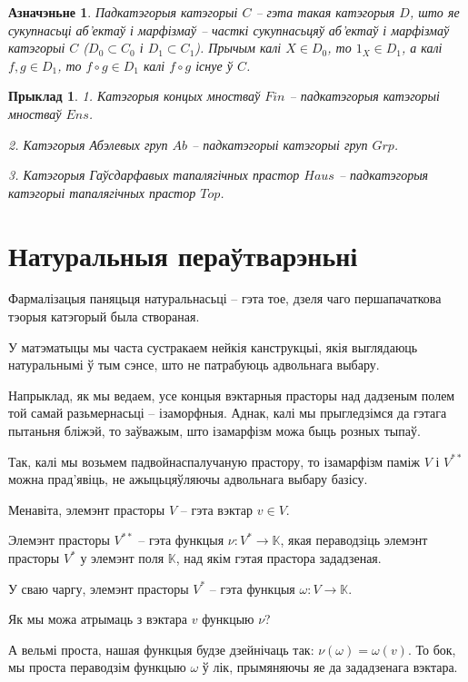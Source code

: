 \documentclass[a4paper,12pt]{book}
\newtheorem{example}{Прыклад}[section]
\newtheorem{definition}{Азначэньне}[section]
\begin{document}
\begin{definition}
  Падкатэгорыя катэгорыі $C$ -- гэта такая катэгорыя $D$, што яе
  сукупнасьці аб'ектаў і марфізмаў -- часткі сукупнасьцяў аб'ектаў
  і марфізмаў катэгорыі $C$ ($D_0 \subset C_0$ і $D_1 \subset
  C_1$). Прычым калі $X \in D_0$, то $1_X \in D_1$, а калі $f, g \in
  D_1$, то $f \circ g \in D_1$ калі $f \circ g$ існуе ў $C$.
\end{definition}

\begin{example}
  1. Катэгорыя концых мностваў $Fin$ -- падкатэгорыя катэгорыі
  мностваў $Ens$.

  2. Катэгорыя Абэлевых груп $Ab$ -- падкатэгорыі катэгорыі груп
  $Grp$.

  3. Катэгорыя Гаўсдарфавых тапалягічных прастор $Haus$ --
  падкатэгорыя катэгорыі тапалягічных прастор $Top$.
\end{example}

\section{Натуральныя пераўтварэньні}

Фармалізацыя паняцьця натуральнасьці -- гэта тое, дзеля чаго
першапачаткова тэорыя катэгорый была створаная.

У матэматыцы мы часта сустракаем нейкія канструкцыі, якія выглядаюць
натуральнымі ў тым сэнсе, што не патрабуюць адвольнага выбару.

Напрыклад, як мы ведаем, усе концыя вэктарныя прасторы над дадзеным
полем той самай разьмернасьці -- ізаморфныя. Аднак, калі мы
прыгледзімся да гэтага пытаньня бліжэй, то заўважым, што ізамарфізм
можа быць розных тыпаў.

Так, калі мы возьмем падвойнаспалучаную прастору, то ізамарфізм паміж
$V$ і $V^{**}$ можна прад'явіць, не ажыцьцяўляючы адвольнага выбару
базісу.

Менавіта, элемэнт прасторы $V$ -- гэта вэктар $v \in V$.

Элемэнт прасторы $V^{**}$ -- гэта функцыя $\nu: V^* \rightarrow
\mathbb{K}$, якая пераводзіць элемэнт прасторы $V^*$ у элемэнт поля
$\mathbb{K}$, над якім гэтая прастора зададзеная.

У сваю чаргу, элемэнт прасторы $V^*$ -- гэта функцыя $\omega: V
\rightarrow \mathbb{K}$.

Як мы можа атрымаць з вэктара $v$ функцыю $\nu$?

А вельмі проста, нашая функцыя будзе дзейнічаць так: $\nu(\omega) =
\omega(v)$. То бок, мы проста пераводзім функцыю $\omega$ ў лік,
прымяняючы яе да зададзенага вэктара.
\end{document}
